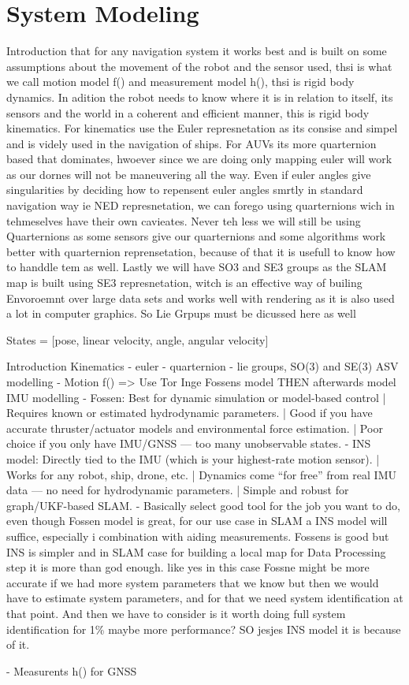 \section{System Modeling}

Introduction that for any navigation system it works best and is built on some assumptions about the movement of the robot and the sensor used, thsi is what we call motion model f() and measurement model h(), thsi is rigid body dynamics. In adition the robot needs to know where it is in relation to itself, its sensors and the world in a coherent and efficient manner, this is rigid body kinematics.
For kinematics use the Euler represnetation as its consise and simpel and is videly used in the navigation of ships. For AUVs its more quarternion based that dominates, hwoever since we are doing only mapping euler will work as our dornes will not be maneuvering all the way. 
Even if euler angles give singularities by deciding how to repensent euler angles smrtly in standard navigation way ie NED represnetation, we can forego using quarternions wich in tehmeselves have their own cavieates. 
Never teh less we will still be using Quarternions as some sensors give our quarternions and some algorithms work better with quarternion reprensetation, because of that it is usefull to know how to handdle tem as well.
Lastly we will have SO3 and SE3 groups as the SLAM map is built using SE3 represnetation, witch is an effective way of builing Envoroemnt over large data sets and works well with rendering as it is also used a lot in computer graphics. So Lie Grpups must be dicussed here as well 

States = [pose, linear velocity, angle, angular velocity]

Introduction
Kinematics 
- euler
- quarternion
- lie groups, SO(3) and SE(3)
ASV modelling
- Motion f() => Use Tor Inge Fossens model THEN afterwards model IMU modelling
   - Fossen: Best for dynamic simulation or model-based control | Requires known or estimated hydrodynamic parameters. | Good if you have accurate thruster/actuator models and environmental force estimation. | Poor choice if you only have IMU/GNSS — too many unobservable states.
   - INS model: Directly tied to the IMU (which is your highest-rate motion sensor). | Works for any robot, ship, drone, etc. | Dynamics come “for free” from real IMU data — no need for hydrodynamic parameters. | Simple and robust for graph/UKF-based SLAM.
   - Basically select good tool for the job you want to do, even though Fossen model is great, for our use case in SLAM a INS model will suffice, especially i combination with aiding measurements. Fossens is good but INS is simpler and in SLAM case for building a local map for Data Processing step it is more than god enough. like yes in this case Fossne might be more accurate if we had more system parameters that we know but then we would have to estimate system parameters, and for that we need system identification at that point. And then we have to consider is it worth doing full system identification for 1\% maybe more performance? SO jesjes INS model it is because of it.

- Measurents h() for GNSS

